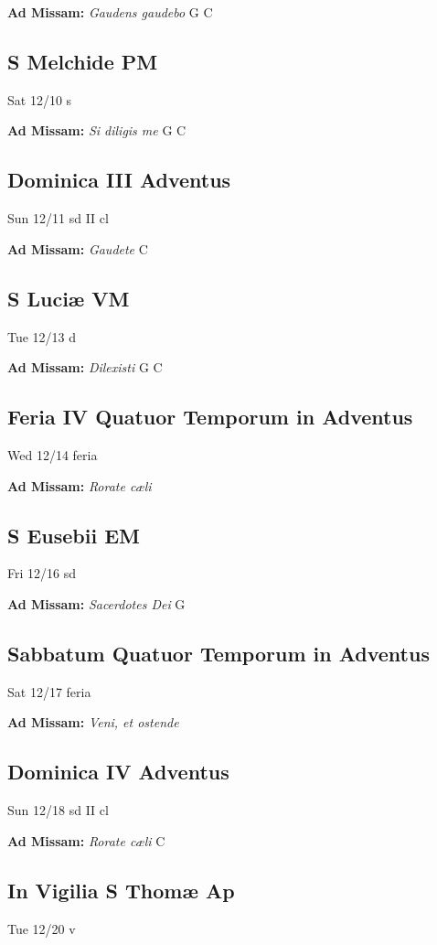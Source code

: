 \documentclass[letterpaper, 10pt, twocolumn]{article}
\begin{document}
\textbf{Ad Missam:} \textit{Gaudens gaudebo} G C 

\subsection*{S Melchide PM}Sat 12/10 s

\textbf{Ad Missam:} \textit{Si diligis me} G C 

\subsection*{Dominica III Adventus}Sun 12/11 sd II cl

\textbf{Ad Missam:} \textit{Gaudete} C 

\subsection*{S Luciæ VM}Tue 12/13 d

\textbf{Ad Missam:} \textit{Dilexisti} G C 

\subsection*{Feria IV Quatuor Temporum in Adventus}Wed 12/14 feria

\textbf{Ad Missam:} \textit{Rorate cæli} 

\subsection*{S Eusebii EM}Fri 12/16 sd

\textbf{Ad Missam:} \textit{Sacerdotes Dei} G 

\subsection*{Sabbatum Quatuor Temporum in Adventus}Sat 12/17 feria

\textbf{Ad Missam:} \textit{Veni, et ostende} 

\subsection*{Dominica IV Adventus}Sun 12/18 sd II cl

\textbf{Ad Missam:} \textit{Rorate cæli} C 

\subsection*{In Vigilia S Thomæ Ap}Tue 12/20 v
\end{document}
